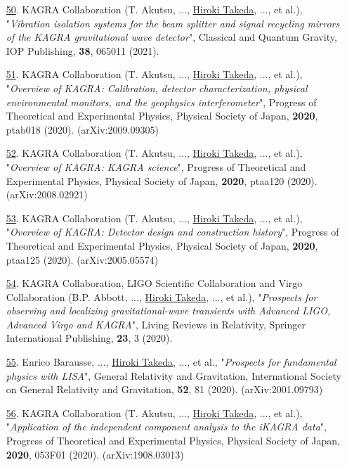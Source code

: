 \documentclass[uplatex, 12pt]{article}
\begin{document}
\begin{enumerate}
\item[\uline{50}.] KAGRA Collaboration (T. Akutsu, ..., \uline{Hiroki Takeda}, ..., et al.),
"\emph{Vibration isolation systems for the beam splitter and signal recycling mirrors of the KAGRA gravitational wave detector}",
Classical and Quantum Gravity, IOP Publishing, {\bf 38}, 065011 (2021).\\

\item[\uline{51}.] KAGRA Collaboration (T. Akutsu, ..., \uline{Hiroki Takeda}, ..., et al.), "\emph{Overview of KAGRA: Calibration, detector characterization, physical environmental monitors, and the geophysics interferometer}", Progress of Theoretical and Experimental Physics, Physical Society of Japan, {\bf 2020}, ptab018 (2020). (arXiv:2009.09305)\\

\item[\uline{52}.] KAGRA Collaboration (T. Akutsu, ..., \uline{Hiroki Takeda}, ..., et al.), "\emph{Overview of KAGRA: KAGRA science}", Progress of Theoretical and Experimental Physics, Physical Society of Japan, {\bf 2020}, ptaa120 (2020). (arXiv:2008.02921)\\

\item[\uline{53}.] KAGRA Collaboration (T. Akutsu, ..., \uline{Hiroki Takeda}, ..., et al.), "\emph{Overview of KAGRA: Detector design and construction history}", Progress of Theoretical and Experimental Physics, Physical Society of Japan, {\bf 2020}, ptaa125 (2020). (arXiv:2005.05574)\\

\item[\uline{54}.] KAGRA Collaboration, LIGO Scientific Collaboration and Virgo Collaboration (B.P. Abbott, ..., \uline{Hiroki Takeda}, ..., et al.), "\emph{Prospects for observing and localizing gravitational-wave transients with Advanced LIGO, Advanced Virgo and KAGRA}", Living Reviews in Relativity, Springer International Publishing, {\bf 23}, 3 (2020).\\

\item[\uline{55}.] Enrico Barausse, ..., \uline{Hiroki Takeda}, ..., et al., "\emph{Prospects for fundamental physics with LISA}", General Relativity and Gravitation, International Society on General Relativity and Gravitation, {\bf 52}, 81 (2020). (arXiv:2001.09793)\\

\item[\uline{56}.] KAGRA Collaboration (T. Akutsu, ..., \uline{Hiroki Takeda}, ..., et al.), "\emph{Application of the independent component analysis to the iKAGRA data}", Progress of Theoretical and Experimental Physics, Physical Society of Japan, {\bf 2020}, 053F01 (2020). (arXiv:1908.03013)\\


\end{enumerate}
\end{document}
